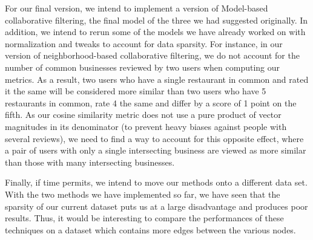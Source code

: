 \documentclass[10pt, letterpaper]{article}
\begin{document}
For our final version, we intend to implement a version of Model-based
collaborative filtering, the final model of the three we had suggested
originally. In addition, we intend to rerun some of the models we have
already worked on with normalization and tweaks to account for data
sparsity. For instance, in our version of neighborhood-based collaborative
filtering, we do not account for the number of common businesses reviewed
by two users when computing our metrics. As a result, two users who have a
single restaurant in common and rated it the same will be considered more
similar than two users who have 5 restaurants in common, rate 4 the same
and differ by a score of 1 point on the fifth. As our cosine similarity
metric does not use a pure product of vector magnitudes in its denominator
(to prevent heavy biases against people with several reviews), we need to
find a way to account for this opposite effect, where a pair of users with
only a single intersecting business are viewed as more similar than those
with many intersecting businesses.

Finally, if time permits, we intend to move our methods onto a different
data set. With the two methods we have implemented so far, we have seen
that the sparsity of our current dataset puts us at a large disadvantage
and produces poor results. Thus, it would be interesting to compare the
performances of these techniques on a dataset which contains more edges
between the various nodes.
\end{document}
